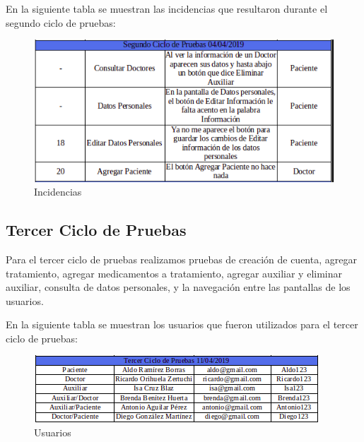 En la siguiente tabla se muestran las incidencias que resultaron durante el segundo ciclo de pruebas:

\begin{figure}[!htbp]			
	\hypertarget{fig:Incidencia2}{\hspace{1pt}}
	\begin{center}
		\includegraphics[height=0.3\textheight]{Pruebas/images/Inc2}
		\caption{Incidencias}
		\label{fig:Incidencia2}
	\end{center}
\end{figure}

\subsection{Tercer Ciclo de Pruebas}

Para el tercer ciclo de pruebas realizamos pruebas de creación de cuenta, agregar tratamiento, agregar medicamentos a tratamiento, agregar auxiliar y eliminar auxiliar, consulta de datos personales, y la navegación entre las pantallas de los usuarios.

En la siguiente tabla se muestran los usuarios que fueron utilizados para el tercer ciclo de pruebas:

\begin{figure}[!htbp]			
	\hypertarget{fig:usuarios3}{\hspace{1pt}}
	\begin{center}
		\includegraphics[height=0.17\textheight]{Pruebas/images/Usuarios3}
		\caption{Usuarios}
		\label{fig:usuarios3}
	\end{center}
\end{figure}


